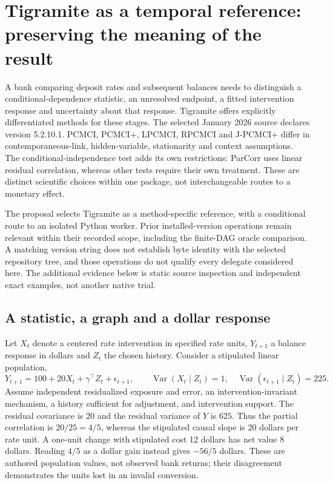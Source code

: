 \section{Tigramite as a temporal reference: preserving the meaning of the result}
\label{exec23:tigramite-scope}
A bank comparing deposit rates and subsequent balances needs to distinguish a conditional-dependence statistic, an unresolved endpoint, a fitted intervention response and uncertainty about that response. Tigramite offers explicitly differentiated methods for these stages. The selected January 2026 source declares version 5.2.10.1. PCMCI, PCMCI+, LPCMCI, RPCMCI and J-PCMCI+ differ in contemporaneous-link, hidden-variable, stationarity and context assumptions. The conditional-independence test adds its own restrictions: ParCorr uses linear residual correlation, whereas other tests require their own treatment. These are distinct scientific choices within one package, not interchangeable routes to a monetary effect. \cite{exec23_tigramite_reuse_source,exec14_pt_tigramite}

The proposal selects Tigramite as a method-specific reference, with a conditional route to an isolated Python worker. Prior installed-version operations remain relevant within their recorded scope, including the finite-DAG oracle comparison. A matching version string does not establish byte identity with the selected repository tree, and those operations do not qualify every delegate considered here. \cite{runtime_tigramite_scope,runtime_networkx_dynamic} The additional evidence below is static source inspection and independent exact examples, not another native trial.

\subsection{A statistic, a graph and a dollar response}
\label{exec23:tigramite-statistic}
Let $X_t$ denote a centered rate intervention in specified rate units, $Y_{t+1}$ a balance response in dollars and $Z_t$ the chosen history. Consider a stipulated linear population,
\begin{equation}
 Y_{t+1}=100+20X_t+\gamma^\top Z_t+\epsilon_{t+1},\qquad
 \operatorname{Var}(X_t\mid Z_t)=1,\quad
 \operatorname{Var}(\epsilon_{t+1}\mid Z_t)=225.
 \label{exec23:tigramite-dollar}
\end{equation}
Assume independent residualized exposure and error, an intervention-invariant mechanism, a history sufficient for adjustment, and intervention support. The residual covariance is $20$ and the residual variance of $Y$ is $625$. Thus the partial correlation is $20/25=4/5$, whereas the stipulated causal slope is 20 dollars per rate unit. A one-unit change with stipulated cost 12 dollars has net value 8 dollars. Reading $4/5$ as a dollar gain instead gives $-56/5$ dollars. These are authored population values, not observed bank returns; their disagreement demonstrates the units lost in an invalid conversion. \cite{exec23_tigramite_reference}

